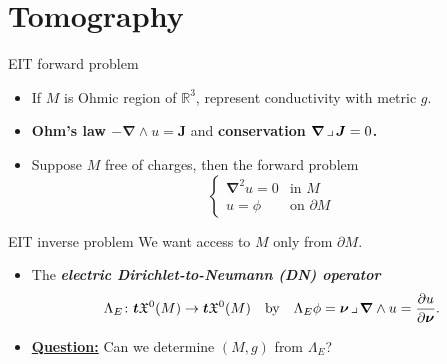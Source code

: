 \documentclass[aspectratio=169]{beamer}
\newcommand\boldgreen[1]{\textcolor{lighter_csu_green}{\emph{\textbf{#1}}}}
\newcommand\boldgold[1]{\textcolor{csu_gold}{\textbf{#1}}}
\newcommand{\tangentpart}{\boldsymbol{t}}
\newcommand{\R}{\mathbb{R}}
\newcommand{\grad}{\boldsymbol{\nabla}}
\newcommand{\blade}[1]{\boldsymbol{#1}}
\newcommand{\boundary}{{\partial M}}
\newcommand{\normal}{\blade{\nu}}
\newcommand{\contract}{\hspace*{.5mm} \lrcorner \hspace*{.5mm}}
\newcommand{\smoothfields}{\mathfrak{X}}
\begin{document}
\section{Tomography}


\begin{frame}{EIT forward problem}
\vfill
\begin{itemize}
\pause
\item If $M$ is Ohmic region of $\R^3$, represent conductivity with metric $g$.
\pause
\item \boldgold{Ohm's law $-\grad\wedge u =\blade{J}$} and \boldgold{conservation $\grad \contract \blade{J}=0$.}
\pause
\item Suppose $M$ free of charges, then the forward problem
\[
\begin{cases}
\grad^2 u = 0 & \textrm{in $M$}\\
u = \phi & \textrm{on $\partial M$}
\end{cases}
\]
\pause
\end{itemize}
\vfill
\end{frame}

\begin{frame}{EIT inverse problem}
\vfill
\pause
We want access to $M$ only from $\boundary$.
\begin{itemize}
\pause
\item The \boldgreen{electric Dirichlet-to-Neumann (DN) operator}
\[
\Lambda_E \colon \tangentpart \smoothfields^0(M) \to \tangentpart \smoothfields^0(M) \quad \textrm{by} \quad  \Lambda_E\phi = \normal \contract \grad \wedge u = \frac{\partial u}{\partial \normal}.
\]
\pause
\item \textbf{\underline{Question:}} Can we determine $(M,g)$ from $\Lambda_E$?
\end{itemize}
\vfill
\end{frame}
\end{document}
